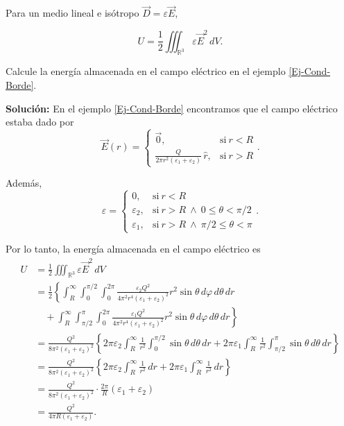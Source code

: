 Para un medio lineal e isótropo $\Vec{D} = \varepsilon \Vec{E}$,
\begin{shaded}
    $$U = \frac{1}{2} \iiint_{\mathbb{R}^3} \varepsilon \Vec{E}^2\,dV.$$
\end{shaded}

\begin{ejemplo}
    Calcule la energía almacenada en el campo eléctrico en el ejemplo \ref{Ej-Cond-Borde}.

    \textbf{Solución:} En el ejemplo \ref{Ej-Cond-Borde} encontramos que el campo eléctrico estaba dado por
    $$\vec{E}(r) = \left\{ \begin{array}{cl}
        \Vec{0}, & \text{si} ~ r < R  \\
         \frac{Q}{2\pi r^2 (\varepsilon_1 + \varepsilon_2)} \,\hat{r},& \text{si} ~ r > R 
    \end{array} \right. .$$

    Además, 
    $$\varepsilon = \left\{ \begin{array}{cl}
        0, & \text{si} ~ r < R  \\
         \varepsilon_2, & \text{si} ~ r > R ~\wedge~ 0 \leq \theta < \pi/2 \\ 
          \varepsilon_1, & \text{si} ~ r > R ~\wedge~ \pi/2 \leq \theta < \pi
    \end{array} \right. .$$

    Por lo tanto, la energía almacenada en el campo eléctrico es
    \begin{align*}
        U &= \frac{1}{2} \iiint_{\mathbb{R}^3} \varepsilon \Vec{E}^2 \,dV \\
        &= \frac{1}{2} \left\{ \int_R^{\infty} \int_0^{\pi/2} \int_0^{2\pi}  \frac{\varepsilon_2 Q^2}{4\pi^2 r^4 (\varepsilon_1 + \varepsilon_2)^2}   r^2 \sin \theta \,d\varphi \,d\theta \,dr \right. \\
        &\left. \quad + \int_R^{\infty} \int_{\pi/2}^{\pi} \int_0^{2\pi}   \frac{\varepsilon_1 Q^2}{4\pi^2 r^4 (\varepsilon_1 + \varepsilon_2)^2}  r^2 \sin \theta \,d\varphi \,d\theta \,dr  \right\} \\
        &= \frac{Q^2}{8\pi^2 (\varepsilon_1 + \varepsilon_2)^2} \left\{ 2\pi \varepsilon_2 \int_R^{\infty} \frac{1}{r^2} \int_0^{\pi/2} \sin \theta \,d\theta \,dr +  2\pi \varepsilon_1 \int_R^{\infty} \frac{1}{r^2} \int_{\pi/2}^{\pi} \sin \theta \,d\theta \,dr \right\} \\
        &= \frac{Q^2}{8\pi^2 (\varepsilon_1 + \varepsilon_2)^2} \left\{ 2\pi \varepsilon_2 \int_R^{\infty} \frac{1}{r^2} \,dr +  2\pi \varepsilon_1 \int_R^{\infty} \frac{1}{r^2} \,dr \right\} \\
        &= \frac{Q^2}{8\pi^2 (\varepsilon_1 + \varepsilon_2)^2} \cdot \frac{2\pi}{R} (\varepsilon_1 + \varepsilon_2) \\
        &= \frac{Q^2}{4\pi R (\varepsilon_1 + \varepsilon_2)}.
    \end{align*}
\end{ejemplo}